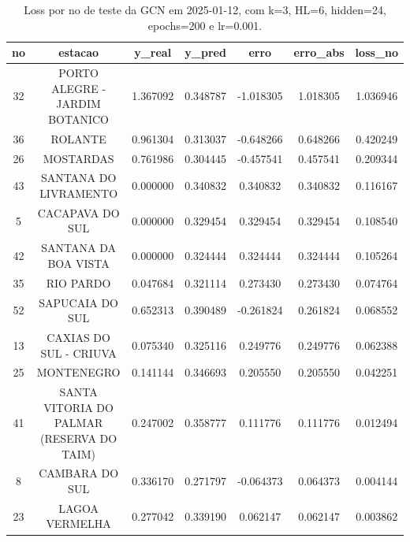 \begin{table}[h]
\centering
\caption{Loss por no de teste da GCN em 2025-01-12, com k=3, HL=6, hidden=24, epochs=200 e lr=0.001.}
\label{tab:gcn_loss_k3_hl6_h24_e200_d20250112}
\begin{tabular}{ccccccc}
\toprule
no & estacao & y\_real & y\_pred & erro & erro\_abs & loss\_no \\
\midrule
32 & PORTO ALEGRE - JARDIM BOTANICO & 1.367092 & 0.348787 & -1.018305 & 1.018305 & 1.036946 \\
36 & ROLANTE & 0.961304 & 0.313037 & -0.648266 & 0.648266 & 0.420249 \\
26 & MOSTARDAS & 0.761986 & 0.304445 & -0.457541 & 0.457541 & 0.209344 \\
43 & SANTANA DO LIVRAMENTO & 0.000000 & 0.340832 & 0.340832 & 0.340832 & 0.116167 \\
5 & CACAPAVA DO SUL & 0.000000 & 0.329454 & 0.329454 & 0.329454 & 0.108540 \\
42 & SANTANA DA BOA VISTA & 0.000000 & 0.324444 & 0.324444 & 0.324444 & 0.105264 \\
35 & RIO PARDO & 0.047684 & 0.321114 & 0.273430 & 0.273430 & 0.074764 \\
52 & SAPUCAIA DO SUL & 0.652313 & 0.390489 & -0.261824 & 0.261824 & 0.068552 \\
13 & CAXIAS DO SUL - CRIUVA & 0.075340 & 0.325116 & 0.249776 & 0.249776 & 0.062388 \\
25 & MONTENEGRO & 0.141144 & 0.346693 & 0.205550 & 0.205550 & 0.042251 \\
41 & SANTA VITORIA DO PALMAR (RESERVA DO TAIM) & 0.247002 & 0.358777 & 0.111776 & 0.111776 & 0.012494 \\
8 & CAMBARA DO SUL & 0.336170 & 0.271797 & -0.064373 & 0.064373 & 0.004144 \\
23 & LAGOA VERMELHA & 0.277042 & 0.339190 & 0.062147 & 0.062147 & 0.003862 \\
\bottomrule
\end{tabular}
\end{table}
